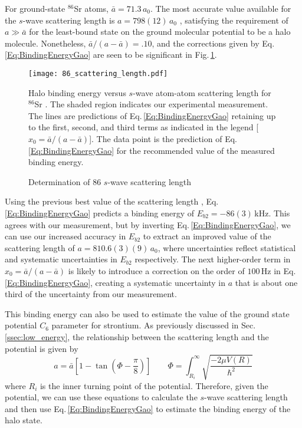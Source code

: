 For ground-state $^{86}$Sr atoms, $\bar{a}=71.3$\,$a_0$.
The most accurate value available for the $s$-wave scattering length is $a=798 (12)$\,$a_0$ \hl{\cite{skt10}}, satisfying the requirement of $a\gg \bar{a}$ for the least-bound state on the ground molecular potential to be a halo molecule.
Nonetheless, ${\bar{a}}/({a-\bar{a}})=.10$, and the corrections given by Eq.\,\ref{Eq:BindingEnergyGao} are seen to be significant in Fig.\,\ref{fig:HaloBindingEnergy}.
	\begin{figure} 
	\centerline{
	  \texttt{[image: 86\_scattering\_length.pdf]}}
	  \caption{Determination of 86 $s$-wave scattering length}{Halo binding energy versus $s$-wave atom-atom scattering length for $^{86}$Sr . The shaded region indicates our experimental measurement. The lines are predictions of Eq.\,\ref{Eq:BindingEnergyGao} retaining up to the first, second, and third terms as indicated in the legend [$x_0={\bar{a}}/({a-\bar{a}})$]. The data point is the prediction of Eq.\,\ref{Eq:BindingEnergyGao} for the recommended value of the measured binding energy.}
	  \label{fig:HaloBindingEnergy}
	\end{figure}
Using the previous best value of the scattering length \hl{\cite{Stein2010}}, Eq.\,\ref{Eq:BindingEnergyGao} predicts a binding energy of $E_{b2}=-86(3)$\,kHz.
This agrees with our measurement, but by inverting Eq.\,\ref{Eq:BindingEnergyGao}, we can use our increased accuracy in $E_{b2}$ to extract an improved value of the scattering length of $a=810.6(3)(9)$\,$a_0$, where uncertainties reflect statistical and systematic uncertainties in $E_{b2}$ respectively.
The next higher-order term in $x_0={\bar{a}}/({a-\bar{a}})$ is likely to introduce a correction on the order of $100$\,Hz in Eq.\,\ref{Eq:BindingEnergyGao}, creating a systematic uncertainty in $a$ that is about one third of the uncertainty from our measurement.

This binding energy can also be used to estimate the value of the ground state potential $C_6$ parameter for strontium.
As previously discussed in Sec.\,\ref{ssec:low_energy}, the relationship between the scattering length and the potential is given by
\begin{equation} \label{eq:5scatterLeng}
	a = \bar{a} \left[ 1 - \tan(\Phi - \frac{\pi}{8}) \right] \quad \quad \Phi = \int_{R_i}^{\infty} \sqrt{\frac{-2\mu V(R)}{\hbar^2}}
\end{equation} 
where $R_i$ is the inner turning point of the potential.
Therefore, given the potential, we can use these equations to calculate the $s$-wave scattering length and then use Eq.\,\ref{Eq:BindingEnergyGao} to estimate the binding energy of the halo state.

